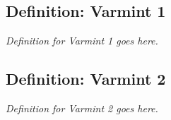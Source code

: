 \subsection{Definition: Varmint 1}
\textit{Definition for Varmint 1 goes here.}

\subsection{Definition: Varmint 2}
\textit{Definition for Varmint 2 goes here.}
